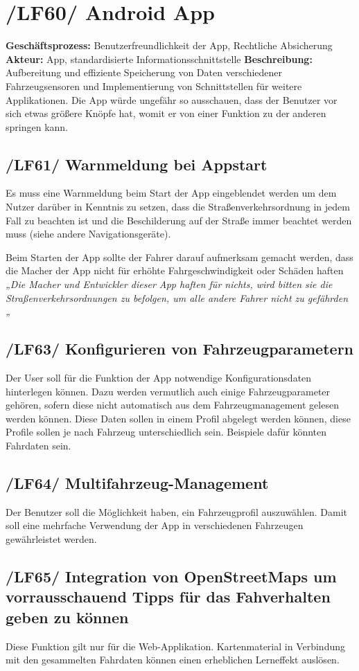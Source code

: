 \newpage

\section{/LF60/ Android App}
\textbf{Geschäftsprozess:}	Benutzerfreundlichkeit der App, Rechtliche Absicherung
\textbf{Akteur:}			App, standardisierte Informationsschnittstelle
\textbf{Beschreibung:}	Aufbereitung und effiziente Speicherung von Daten verschiedener Fahrzeugsensoren und Implementierung von Schnittstellen für weitere Applikationen. 
Die App würde ungefähr so ausschauen, dass der Benutzer vor sich etwas größere Knöpfe hat,                                        
womit er von einer Funktion zu der anderen springen kann.

\subsection{/LF61/ Warnmeldung bei Appstart}
\nextline
Es muss eine Warnmeldung beim Start der App eingeblendet werden um dem Nutzer darüber in Kenntnis zu setzen, dass die Straßenverkehrsordnung in jedem Fall zu beachten ist und die Beschilderung auf der Straße immer beachtet werden muss (siehe andere Navigationsgeräte).

Beim Starten der App sollte der Fahrer darauf aufmerksam gemacht werden, dass die Macher der App nicht für erhöhte Fahrgeschwindigkeit oder Schäden haften
\emph{„Die Macher und Entwickler dieser App haften für nichts, wird bitten sie die Straßenverkehrsordnungen zu befolgen, um alle andere Fahrer nicht zu gefährden „}


\subsection{/LF63/ Konfigurieren von Fahrzeugparametern}
\nextline
Der User soll für die Funktion der App notwendige Konfigurationsdaten hinterlegen können. Dazu werden vermutlich auch einige Fahrzeugparameter gehören, sofern diese nicht automatisch aus dem Fahrzeugmanagement gelesen werden können. Diese Daten sollen in einem Profil abgelegt werden können, diese Profile sollen je nach Fahrzeug unterschiedlich sein. Beispiele dafür könnten Fahrdaten sein.

\subsection{/LF64/ Multifahrzeug-Management}
\nextline
Der Benutzer soll die Möglichkeit haben, ein Fahrzeugprofil auszuwählen. Damit soll eine mehrfache Verwendung der App in verschiedenen Fahrzeugen gewährleistet werden.

\subsection{/LF65/ Integration von OpenStreetMaps um vorrausschauend Tipps für das Fahverhalten geben zu können}
\nextline
Diese Funktion gilt nur für die Web-Applikation. Kartenmaterial in Verbindung mit den gesammelten Fahrdaten können einen erheblichen Lerneffekt auslösen.